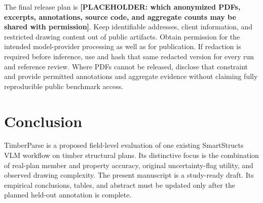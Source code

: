 \documentclass[11pt]{article}
\newcommand{\todo}[1]{\textcolor{blue!65!black}{\textbf{[PLACEHOLDER: #1]}}}
\begin{document}
The final release plan is \todo{which anonymized PDFs, excerpts, annotations, source code, and aggregate counts may be shared with permission}. Keep identifiable addresses, client information, and restricted drawing content out of public artifacts. Obtain permission for the intended model-provider processing as well as for publication. If redaction is required before inference, use and hash that same redacted version for every run and reference review. Where PDFs cannot be released, disclose that constraint and provide permitted annotations and aggregate evidence without claiming fully reproducible public benchmark access.

\section{Conclusion}
TimberParse is a proposed field-level evaluation of one existing SmartStructs VLM workflow on timber structural plans. Its distinctive focus is the combination of real-plan member and property accuracy, original uncertainty-flag utility, and observed drawing complexity. The present manuscript is a study-ready draft. Its empirical conclusions, tables, and abstract must be updated only after the planned held-out annotation is complete.
\end{document}
